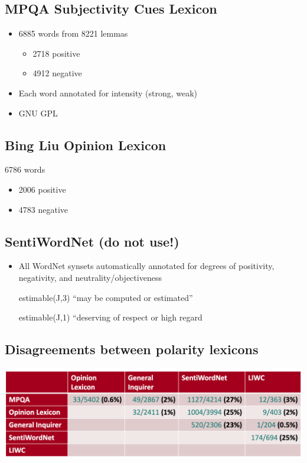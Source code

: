 \documentclass[11pt]{article}
\theoremstyle{definition}
\begin{document}
\subsection{MPQA Subjectivity Cues Lexicon}
\begin{itemize}
  \item 6885 words from 8221 lemmas
  \begin{itemize}
    \item 2718 positive
    \item 4912 negative
  \end{itemize}
  \item Each word annotated for intensity (strong, weak)
  \item GNU GPL
\end{itemize}

\subsection{Bing Liu Opinion Lexicon}
6786 words
\begin{itemize}
  \item 2006 positive
  \item 4783 negative
\end{itemize}

\subsection{SentiWordNet (do not use!)}
\begin{itemize}
  \item All WordNet synsets automatically annotated for degrees of positivity,
  negativity, and neutrality/objectiveness
  \item [estimable(J,3)] “may be computed or estimated”
  \item [estimable(J,1)] “deserving of respect or high regard
\end{itemize}

\subsection{Disagreements between polarity lexicons}
\includegraphics[width=\textwidth]{14.png}
\end{document}
